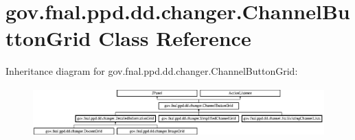 \hypertarget{classgov_1_1fnal_1_1ppd_1_1dd_1_1changer_1_1ChannelButtonGrid}{\section{gov.\-fnal.\-ppd.\-dd.\-changer.\-Channel\-Button\-Grid Class Reference}
\label{classgov_1_1fnal_1_1ppd_1_1dd_1_1changer_1_1ChannelButtonGrid}
}
Inheritance diagram for gov.\-fnal.\-ppd.\-dd.\-changer.\-Channel\-Button\-Grid\-:\begin{figure}[H]
\begin{center}
\leavevmode
\includegraphics[height=1.891892cm]{classgov_1_1fnal_1_1ppd_1_1dd_1_1changer_1_1ChannelButtonGrid}
\end{center}
\end{figure}
